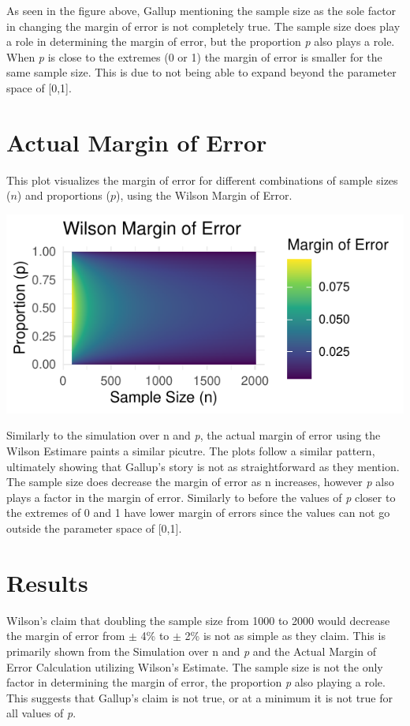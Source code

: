 \documentclass{article}\usepackage[]{graphicx}\usepackage[]{xcolor}
\makeatletter
\def\maxwidth{ %
  \ifdim\Gin@nat@width>\linewidth
    \linewidth
  \else
    \Gin@nat@width
  \fi
}
\newenvironment{knitrout}{}{} %
\makeatother
\begin{document}
\begin{multicols}{2}
As seen in the figure above, Gallup mentioning the sample size as the sole factor in changing the margin of error is not completely true. The sample size does play a role in determining the margin of error, but the proportion \emph{p} also plays a role. When \emph{p} is close to the extremes (0 or 1) the margin of error is smaller for the same sample size. This is due to not being able to expand beyond the parameter space of [0,1].

\section{Actual Margin of Error}

This plot visualizes the margin of error for different combinations of sample sizes ($n$) and proportions ($p$), using the Wilson Margin of Error.

\begin{knitrout}
\color{fgcolor}
\includegraphics[width=\maxwidth]{figure/unnamed-chunk-4-1} 
\end{knitrout}

Similarly to the simulation over n and \emph{p}, the actual margin of error using the Wilson Estimare paints a similar picutre. The plots follow a similar pattern, ultimately showing that Gallup's story is not as straightforward as they mention. The sample size does decrease the margin of error as n increases, however \emph{p} also plays a factor in the margin of error. Similarly to before the values of \emph{p} closer to the extremes of 0 and 1 have lower margin of errors since the values can not go outside the parameter space of [0,1].

\section{Results}
Wilson's claim that doubling the sample size from 1000 to 2000 would decrease the margin of error from $\pm$ 4\% to $\pm$ 2\% is not as simple as they claim. This is primarily shown from the Simulation over n and \emph{p} and the Actual Margin of Error Calculation utilizing Wilson's Estimate. The sample size is not the only factor in determining the margin of error, the proportion \emph{p} also playing a role. This suggests that Gallup's claim is not true, or at a minimum it is not true for all values of \emph{p}.


\begin{tiny}

\end{tiny}
\end{multicols}
\end{document}
